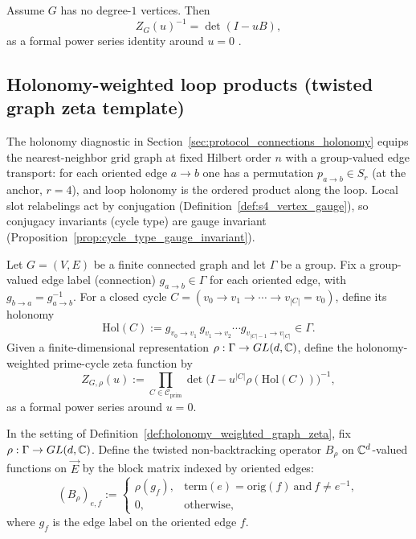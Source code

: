 \begin{theorem}\label{thm:ihara_as_hashimoto_det}
\MathTag Assume $G$ has no degree-$1$ vertices.
Then
\[
Z_G(u)^{-1}=\det(I-uB),
\]
as a formal power series identity around $u=0$ \cite{Hashimoto1989,Terras2010}.
\end{theorem}

\subsection{Holonomy-weighted loop products (twisted graph zeta template)}
\label{subsec:twisted_graph_zeta_holonomy}

The holonomy diagnostic in Section~\ref{sec:protocol_connections_holonomy} equips the nearest-neighbor grid graph at fixed Hilbert order $n$ with a group-valued edge transport:
for each oriented edge $a\to b$ one has a permutation $p_{a\to b}\in S_r$ (at the anchor, $r=4$), and loop holonomy is the ordered product along the loop.
Local slot relabelings act by conjugation (Definition~\ref{def:s4_vertex_gauge}), so conjugacy invariants (cycle type) are gauge invariant (Proposition~\ref{prop:cycle_type_gauge_invariant}).

\begin{definition}
\label{def:holonomy_weighted_graph_zeta}
\MathTag Let $G=(V,E)$ be a finite connected graph and let $\Gamma$ be a group.
Fix a group-valued edge label (connection) $g_{a\to b}\in\Gamma$ for each oriented edge, with $g_{b\to a}=g_{a\to b}^{-1}$.
For a closed cycle $C=(v_0\to v_1\to\cdots\to v_{|C|}=v_0)$, define its holonomy
\[
\mathrm{Hol}(C):=g_{v_0\to v_1}\,g_{v_1\to v_2}\cdots g_{v_{|C|-1}\to v_{|C|}}\in\Gamma.
\]
Given a finite-dimensional representation $\rho:\Gamma\to GL(d,\mathbb{C})$, define the holonomy-weighted prime-cycle zeta function by
\begin{equation}
\label{eq:holonomy_weighted_graph_zeta}
Z_{G,\rho}(u):=\prod_{C\in\mathcal{C}_{\mathrm{prim}}}\det\!\bigl(I-u^{|C|}\rho(\mathrm{Hol}(C))\bigr)^{-1},
\end{equation}
as a formal power series around $u=0$.
\end{definition}

\begin{definition}\label{def:twisted_hashimoto_operator}
\MathTag In the setting of Definition~\ref{def:holonomy_weighted_graph_zeta}, fix $\rho:\Gamma\to GL(d,\mathbb{C})$.
Define the twisted non-backtracking operator $B_\rho$ on $\mathbb{C}^d$-valued functions on $\overrightarrow{E}$ by the block matrix indexed by oriented edges:
\[
(B_\rho)_{e,f}:=
\begin{cases}
\rho(g_f), & \mathrm{term}(e)=\mathrm{orig}(f)\ \text{and}\ f\neq e^{-1},\\
0, & \text{otherwise},
\end{cases}
\]
where $g_f$ is the edge label on the oriented edge $f$.
\end{definition}

